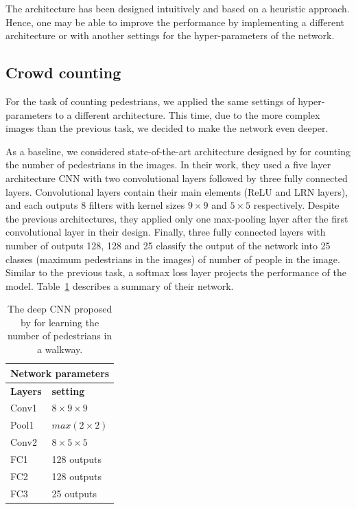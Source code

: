 The architecture has been designed intuitively and based on a heuristic approach. Hence, one may be able to improve the performance by implementing a different architecture or with another settings for the hyper-parameters of the network. 

\subsection{Crowd counting}
\label{subsec:ucsdarch}

For the task of counting pedestrians, we applied the same settings of hyper-parameters to a different architecture. This time, due to the more complex images than the previous task, we decided to make the network even deeper.

As a baseline, we considered state-of-the-art architecture designed by \citealt*{segui2015learning} for counting the number of pedestrians in the images. In their work, they used a five layer architecture CNN with two convolutional layers followed by three fully connected layers. Convolutional layers contain their main elements (ReLU and LRN layers), and each outputs 8 filters with kernel sizes $9\times9$ and $5\times5$ respectively. Despite the previous architectures, they applied only one max-pooling layer after the first convolutional layer in their design. Finally, three fully connected layers with number of outputs 128, 128 and 25 classify the output of the network into 25 classes (maximum pedestrians in the images) of number of people in the image. Similar to the previous task, a softmax loss layer projects the performance of the model. Table~\ref{santiarch} describes a summary of their network.

\begin{table}[H]
	\centering
	\begin{tabular}{ |p{2cm}|p{2cm}| }
	\hline 
	\multicolumn{2}{|c|}{\textbf{Network parameters}} \\
	\hline
	\hline
	\textbf{Layers} & \textbf{setting }\\
	\hline
	Conv1 & $8\times9\times9$\\
	\hline
	Pool1    & $max(2\times2)$ \\
	\hline
	Conv2 & $8\times5\times5$\\
	\hline
	FC1 & 128 outputs \\
	\hline
	FC2 & 128 outputs \\
	\hline
	FC3 & 25 outputs \\
	\hline
	\end{tabular}
		\caption{The deep CNN proposed by \citealt{segui2015learning} for learning the number of pedestrians in a walkway.}
		\label{santiarch}
\end{table}
 

